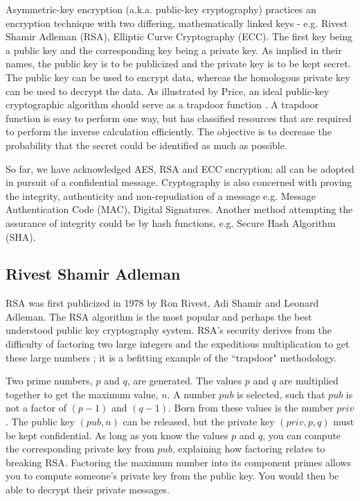 Asymmetric-key encryption (a.k.a. public-key cryptography) practices an encryption technique with two differing, mathematically linked keys - e.g. Rivest Shamir Adleman (RSA), Elliptic Curve Cryptography (ECC). The first key being a public key and the corresponding key being a private key. As implied in their names, the public key is to be publicized and the private key is to be kept secret. The public key can be used to encrypt data, whereas the homologous private key can be used to decrypt the data. As illustrated by Price, an ideal public-key cryptographic algorithm should serve as a trapdoor function \cite{Understanding_Cryptog}. A trapdoor function is easy to perform one way, but has classified resources that are required to perform the inverse calculation efficiently. The objective is to decrease the probability that the secret could be identified as much as possible.

So far, we have acknowledged AES, RSA and ECC encryption; all can be adopted in pursuit of a confidential message. Cryptography is also concerned with proving the integrity, authenticity and non-repudiation of a message e.g. Message Authentication Code (MAC), Digital Signatures. Another method attempting the assurance of integrity could be by hash functions, e.g. Secure Hash Algorithm (SHA).

\subsection{Rivest Shamir Adleman}
 RSA was first publicized in 1978 by Ron Rivest, Adi Shamir and Leonard Adleman. The RSA algorithm is the most popular and  perhaps the best understood public key cryptography system. RSA's security derives from the difficulty of factoring two large integers and the expeditious multiplication to get these large numbers \cite{RSA_ECC}; it is a befitting example of the ``trapdoor" methodology. 
 
 Two prime numbers, \(p\) and \(q\), are generated. The values \(p\) and \(q\) are multiplied together to get the maximum value, \(n\). 
 A number \(pub\) is selected, such that \(pub\) is not a factor of \((p - 1)\) and \((q - 1)\). %
 Born from these values is the number \(priv\).
 The public key \((pub,n)\) can be released, but the private key \((priv,p,q)\) must be kept confidential.
 As long as you know the values \(p\) and \(q\), you can compute the corresponding private key from \(pub\), explaining how factoring relates to breaking RSA. Factoring the maximum number into its component primes allows you to compute someone's private key from the public key. You would then be able to decrypt their private messages.

